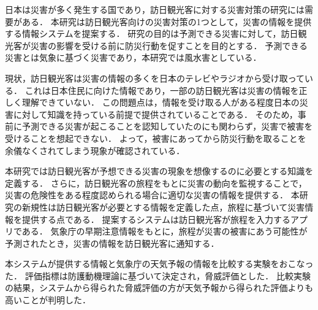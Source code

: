 

日本は災害が多く発生する国であり，訪日観光客に対する災害対策の研究には需要がある．
本研究は訪日観光客向けの災害対策の1つとして，災害の情報を提供する情報システムを提案する．
研究の目的は予測できる災害に対して，訪日観光客が災害の影響を受ける前に防災行動を促すことを目的とする．
予測できる災害とは気象に基づく災害であり，本研究では風水害としている．\par
現状，訪日観光客は災害の情報の多くを日本のテレビやラジオから受け取っている．
これは日本住民に向けた情報であり，一部の訪日観光客は災害の情報を正しく理解できていない．
この問題点は，情報を受け取る人がある程度日本の災害に対して知識を持っている前提で提供されていることである．
そのため，事前に予測できる災害が起こることを認知していたのにも関わらず，災害で被害を受けることを想起できない．
よって，被害にあってから防災行動を取ることを余儀なくされてしまう現象が確認されている．\par
本研究では訪日観光客が予想できる災害の現象を想像するのに必要とする知識を定義する．
さらに，訪日観光客の旅程をもとに災害の動向を監視することで，災害の危険性をある程度認められる場合に適切な災害の情報を提供する．
本研究の新規性は訪日観光客が必要とする情報を定義した点，旅程に基づいて災害情報を提供する点である．
提案するシステムは訪日観光客が旅程を入力するアプリである．
気象庁の早期注意情報をもとに，旅程が災害の被害にあう可能性が予測されたとき，災害の情報を訪日観光客に通知する．\par
本システムが提供する情報と気象庁の天気予報の情報を比較する実験をおこなった．
評価指標は防護動機理論に基づいて決定され，脅威評価とした．
比較実験の結果，システムから得られた脅威評価の方が天気予報から得られた評価よりも高いことが判明した．